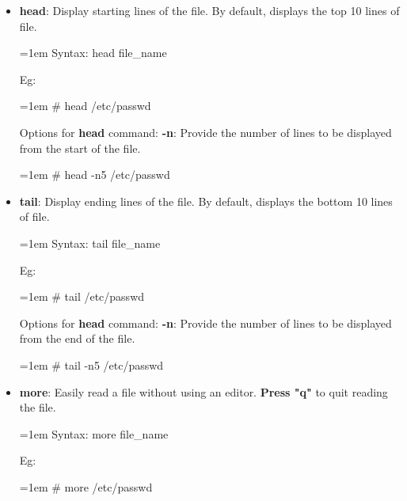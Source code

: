 \begin{flushleft}
\begin{itemize}
		\newpage
				
		\item \textbf{head}: Display starting lines of the file. By default, displays the top 10 lines of file.
		\bigskip
		\begin{tcolorbox}[breakable,notitle,boxrule=-0pt,colback=pink,colframe=pink]
			\color{black}
			\font=1em
			Syntax: head file\_name
			\font=4pt
		\end{tcolorbox}
		Eg:
		\bigskip
		\begin{tcolorbox}[breakable,notitle,boxrule=-0pt,colback=black,colframe=black]
			\color{green}
			\font=1em
			\# head /etc/passwd
			\font=4pt
		\end{tcolorbox}		
		Options for \textbf{head} command:
		\newline
		\textbf{-n}: Provide the number of lines to be displayed from the start of the file.
		\bigskip
		\begin{tcolorbox}[breakable,notitle,boxrule=-0pt,colback=black,colframe=black]
			\color{green}
			\font=1em
			\# head -n5 /etc/passwd
			\font=4pt
		\end{tcolorbox}		

		\bigskip
		\bigskip
		\item \textbf{tail}: Display ending lines of the file. By default, displays the bottom 10 lines of file.
		\bigskip
		\begin{tcolorbox}[breakable,notitle,boxrule=-0pt,colback=pink,colframe=pink]
			\color{black}
			\font=1em
			Syntax: tail file\_name
			\font=4pt
		\end{tcolorbox}
		Eg:
		\bigskip
		\begin{tcolorbox}[breakable,notitle,boxrule=-0pt,colback=black,colframe=black]
			\color{green}
			\font=1em
			\# tail /etc/passwd
			\font=4pt
		\end{tcolorbox}		
		Options for \textbf{head} command:
		\newline
		\textbf{-n}: Provide the number of lines to be displayed from the end of the file.
		\bigskip
		\begin{tcolorbox}[breakable,notitle,boxrule=-0pt,colback=black,colframe=black]
			\color{green}
			\font=1em
			\# tail -n5 /etc/passwd
			\font=4pt
		\end{tcolorbox}		

		\bigskip
		\bigskip
		\item \textbf{more}: Easily read a file without using an editor. \textbf{Press "q"} to quit reading the file.
		\bigskip
		\begin{tcolorbox}[breakable,notitle,boxrule=-0pt,colback=pink,colframe=pink]
			\color{black}
			\font=1em
			Syntax: more file\_name
			\font=4pt
		\end{tcolorbox}
		Eg:
		\bigskip
		\begin{tcolorbox}[breakable,notitle,boxrule=-0pt,colback=black,colframe=black]
			\color{green}
			\font=1em
			\# more /etc/passwd
			\font=4pt
		\end{tcolorbox}		



\end{itemize}
\end{flushleft}
